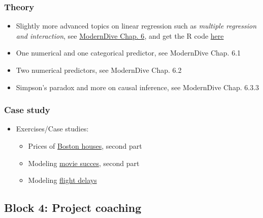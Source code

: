 \documentclass[
  letterpaper,
  DIV=11,
  numbers=noendperiod]{scrreprt}
\providecommand{\tightlist}{%
  \setlength{\itemsep}{0pt}\setlength{\parskip}{0pt}}\usepackage{longtable,booktabs,array}
\theoremstyle{definition}
\theoremstyle{definition}
\theoremstyle{remark}
\begin{document}
\hypertarget{theory-1}{%
\subsubsection*{Theory}\label{theory-1}}

\begin{itemize}
\item
  Slightly more advanced topics on linear regression such as
  \emph{multiple regression and interaction}, see
  \href{https://moderndive.com/6-multiple-regression.html}{ModernDive
  Chap. 6}, and get the R code
  \href{http://moderndive.com/scripts/06-multiple-regression.R}{here}
\item
  One numerical and one categorical predictor, see ModernDive Chap. 6.1
\item
  Two numerical predictors, see ModernDive Chap. 6.2
\item
  Simpson's paradox and more on causal inference, see ModernDive Chap.
  6.3.3
\end{itemize}

\hypertarget{case-study-1}{%
\subsubsection*{Case study}\label{case-study-1}}

\begin{itemize}
\tightlist
\item
  Exercises/Case studies:

  \begin{itemize}
  \tightlist
  \item
    Prices of
    \href{https://moderndive.com/11-thinking-with-data.html\#seattle-house-prices}{Boston
    houses}, second part
  \item
    Modeling
    \href{https://data-se.netlify.app/2021/02/24/modelling-movie-successes-linear-regression/}{movie
    succes}, second part
  \item
    Modeling
    \href{https://data-se.netlify.app/slides/hands-on-data-exploration/handson-data-workshop_2018-11-21.html\#68}{flight
    delays}
  \end{itemize}
\end{itemize}

\hypertarget{block-4-project-coaching}{%
\subsection*{Block 4: Project coaching}\label{block-4-project-coaching}}
\end{document}
